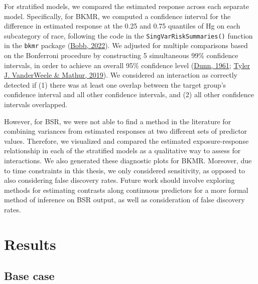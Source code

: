 \documentclass[12pt, twoside]{amherstthesis}
\begin{document}
For stratified models, we compared the estimated response across each separate model. Specifically, for BKMR, we computed a confidence interval for the difference in estimated response at the 0.25 and 0.75 quantiles of Hg on each subcategory of race, following the code in the \texttt{SingVarRiskSummaries()} function in the \texttt{bkmr} package (\protect\hyperlink{ref-bobb_bkmr_2022}{Bobb, 2022}). We adjusted for multiple comparisons based on the Bonferroni procedure by constructing 5 simultaneous 99\% confidence intervals, in order to achieve an overall 95\% confidence level (\protect\hyperlink{ref-dunn_multiple_1961}{Dunn, 1961}; \protect\hyperlink{ref-vanderweele_desirable_2019}{Tyler J. VanderWeele \& Mathur, 2019}). We considered an interaction as correctly detected if (1) there was at least one overlap between the target group's confidence interval and all other confidence intervals, and (2) all other confidence intervals overlapped.

However, for BSR, we were not able to find a method in the literature for combining variances from estimated responses at two different sets of predictor values. Therefore, we visualized and compared the estimated exposure-response relationship in each of the stratified models as a qualitative way to assess for interactions. We also generated these diagnostic plots for BKMR. Moreover, due to time constraints in this thesis, we only considered sensitivity, as opposed to also considering false discovery rates. Future work should involve exploring methods for estimating contrasts along continuous predictors for a more formal method of inference on BSR output, as well as consideration of false discovery rates.

\hypertarget{results}{%
\section{Results}\label{results}}

\hypertarget{base-case}{%
\subsection{Base case}\label{base-case}}
\end{document}

